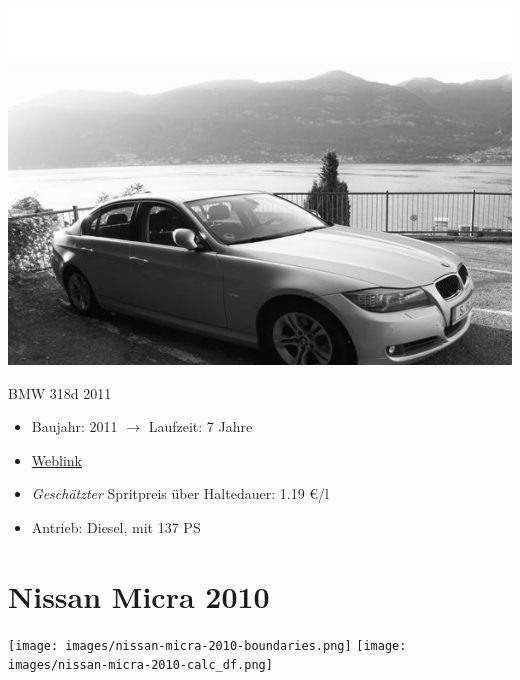 \documentclass[landscape, DIV=99, 14pt]{scrartcl}
\begin{document}
\pagebreak
\null
\vspace{2cm}
\begin{center}
\includegraphics[width=0.9\columnwidth]{cars/bmw-3er-maximus.png}

BMW 318d 2011
\end{center}

\begin{itemize}
    \item Baujahr: 2011 $\rightarrow$ Laufzeit: 7 Jahre
    \item \href{https://de.wikipedia.org/wiki/BMW_E90}{Weblink}
    \item \emph{Gesch\"atzter} Spritpreis \"uber Haltedauer: 1.19 \euro{}/l
    \item Antrieb: Diesel, mit 137 PS
\end{itemize}

\pagebreak


\twocolumn

\section*{Nissan Micra 2010}
\begin{center}
\texttt{[image: images/nissan-micra-2010-boundaries.png]}
\null
\vspace{0.5cm}
\texttt{[image: images/nissan-micra-2010-calc\_df.png]}
\end{center}
\end{document}

